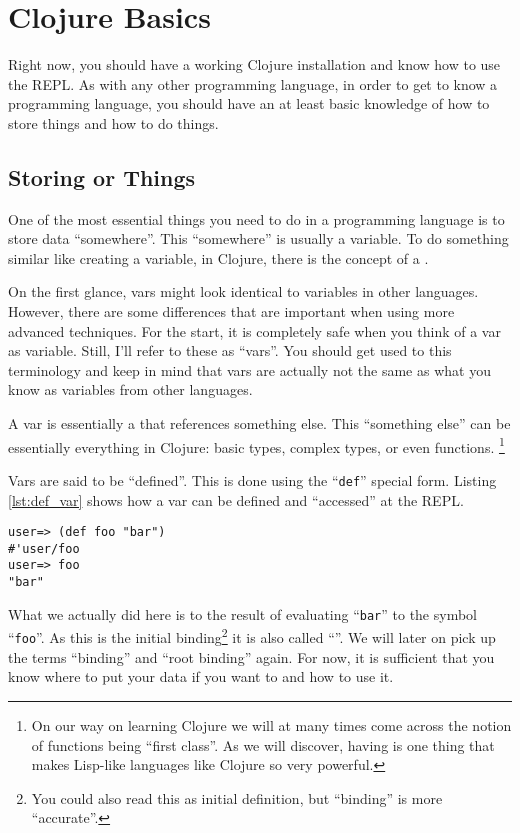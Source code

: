 \chapter{Clojure Basics}
Right now, you should have a working Clojure installation and know how to use the REPL.
As with any other programming language, in order to get to know a programming language, you should have an at least basic knowledge of how to store things and how to do things.

\section{Storing or Things}
One of the most essential things you need to do in a programming language is to store data ``somewhere''.
This ``somewhere'' is usually a variable.
To do something similar like creating a variable, in Clojure, there is the concept of a .

On the first glance, vars might look identical to variables in other languages.
However, there are some differences that are important when using more advanced techniques.
For the start, it is completely safe when you think of a var as variable.
Still, I'll refer to these as ``vars''.
You should get used to this terminology and keep in mind that vars are actually not the same as what you know as variables from other languages.

A var is essentially a  that references something else.
This ``something else'' can be essentially everything in Clojure: basic types, complex types, or even functions.
\footnote{On our way on learning Clojure we will at many times come across the notion of functions being ``first class''.
As we will discover, having  is one thing that makes Lisp-like languages like Clojure so very powerful.}

Vars are said to be ``defined''.
This is done using the ``\texttt{def}'' special form.
Listing \vref{lst:def_var} shows how a var can be defined and ``accessed'' at the REPL.

\begin{lstlisting}[label=lst:def_var, caption=Experiments with Boolean Values at the REPL]
user=> (def foo "bar")
#'user/foo
user=> foo
"bar"
\end{lstlisting}

What we actually did here is to  the result of evaluating ``\texttt{bar}'' to the symbol ``\texttt{foo}''.
As this is the initial binding\footnote{You could also read this as initial definition, but ``binding'' is more ``accurate''.} it is also called ``''.
We will later on pick up the terms ``binding'' and ``root binding'' again.
For now, it is sufficient that you know where to put your data if you want to and how to use it.

